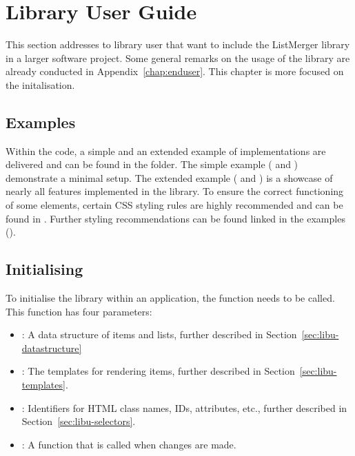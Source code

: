 %
%
% 
% 
% 

\chapter{Library User Guide}
\label{chap:libuser}

This section addresses to library user that want to include the
ListMerger library in a larger software project. Some general remarks on
the usage of the library are already conducted in
Appendix~\ref{chap:enduser}. This chapter is more focused on the
initalisation.






\section{Examples}

Within the code, a simple and an extended example of implementations are
delivered and can be found in the  folder. The
simple example ( and ) demonstrate a
minimal setup. The extended example ( and
) is a showcase of nearly all features implemented in the
library. To ensure the correct functioning of some elements, certain CSS
styling rules are highly recommended and can be found in
. Further styling recommendations can be found
linked in the examples ().





\section{Initialising}
\label{sec:libu-init}

To initialise the library within an application, the 
function needs to be called. This function has four parameters:
\begin{itemize}
  \item {}: A data structure of items and lists, further
    described in Section~\ref{sec:libu-datastructure}
  \item {}: The templates for rendering items, further
    described in Section~\ref{sec:libu-templates}.
  \item {}: Identifiers for HTML class names, IDs,
    attributes, etc., further described in Section~\ref{sec:libu-selectors}.
  \item {}: A function that is called when changes
    are made.
\end{itemize}

